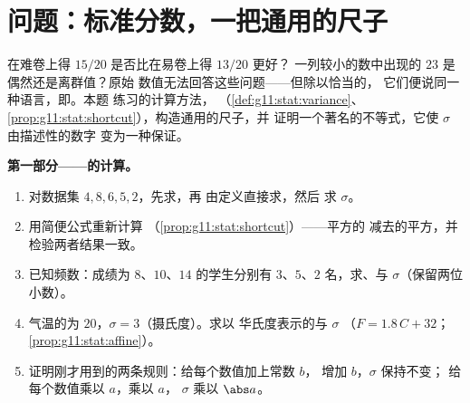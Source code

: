 \section{问题：标准分数，一把通用的尺子}

\begin{problem}
\label{pb:g11:stat:1}
在难卷上得 $15/20$ 是否比在易卷上得 $13/20$ 更好？
一列较小的数中出现的 $23$ 是偶然还是离群值？原始
数值无法回答这些问题——但除以恰当的，
它们便说同一种语言，即\emph{}。本题
练习的计算方法，
（\cref{def:g11:stat:variance}、
\cref{prop:g11:stat:shortcut}），构造通用的尺子，并
证明一个著名的不等式，它使 $\sigma$ 由描述性的数字
变为一种保证。

\medskip
\noindent\textbf{第一部分——的计算。}
\begin{enumerate}
  \item 对数据集 $4, 8, 6, 5, 2$，先求，再
        由定义直接求，然后
        求 $\sigma$。
  \item 用简便公式重新计算
        （\cref{prop:g11:stat:shortcut}）——平方的
        减去的平方，并检验两者结果一致。
  \item 已知频数：成绩为 $8$、$10$、$14$ 的学生分别有
        $3$、$5$、$2$ 名，求、与
        $\sigma$（保留两位小数）。
  \item 气温的为 $20$，$\sigma = 3$（摄氏度）。求以
        华氏度表示的与 $\sigma$
        （$F = 1.8\,C + 32$；\cref{prop:g11:stat:affine}）。
  \item 证明刚才用到的两条规则：给每个数值加上常数 $b$，
        增加 $b$，$\sigma$ 保持不变；
        给每个数值乘以 $a$，乘以 $a$，
        $\sigma$ 乘以 $\abs a$。
\end{enumerate}


\end{problem}
